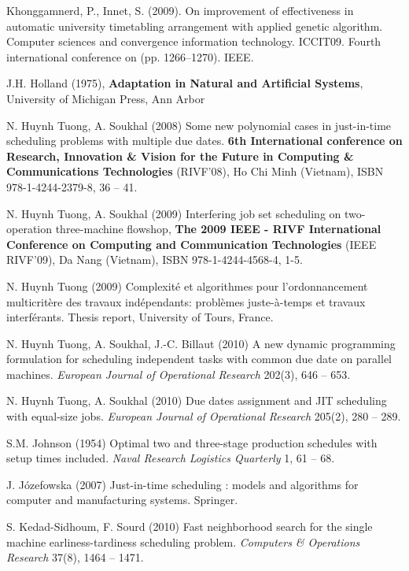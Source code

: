 \documentclass[11pt]{article}
\begin{document}
\begin{thebibliography}{19}
Khonggamnerd, P., Innet, S. (2009). 
On improvement of effectiveness in automatic university timetabling arrangement with applied genetic algorithm. Computer sciences and convergence information technology. 
ICCIT09. Fourth international conference on (pp. 1266–1270). IEEE. 

J.H. Holland (1975), 
\textbf{Adaptation in Natural and Artificial Systems}, University of Michigan Press, Ann Arbor

N. Huynh Tuong, A. Soukhal (2008) 
Some new polynomial cases in just-in-time scheduling problems with multiple due dates. 
\textbf{6th International conference on Research, Innovation \& Vision for the Future in Computing \& Communications Technologies} (RIVF'08), Ho Chi Minh (Vietnam), ISBN 978-1-4244-2379-8, 36 -- 41.

N. Huynh Tuong, A. Soukhal (2009) 
Interfering job set scheduling on two-operation three-machine flowshop, 
\textbf{The 2009 IEEE - RIVF International Conference on Computing and Communication Technologies} (IEEE RIVF'09), Da Nang (Vietnam), ISBN 978-1-4244-4568-4, 1-5.

N. Huynh Tuong (2009) 
Complexité et algorithmes pour l'ordonnancement multicritère des travaux indépendants: problèmes juste-à-temps et travaux interférants. Thesis report, University of Tours, France.  

N. Huynh Tuong, A. Soukhal, J.-C. Billaut (2010) 
A new dynamic programming formulation for scheduling independent tasks with common due date on parallel machines. 
\textit{European Journal of Operational Research} 202(3), 646 -- 653.

N. Huynh Tuong, A. Soukhal (2010) 
Due dates assignment and JIT scheduling with equal-size jobs. 
\textit{European Journal of Operational Research} 205(2), 280 -- 289.


S.M. Johnson (1954) 
Optimal two and three-stage production schedules with setup times included. 
\textit{Naval Research Logistics Quarterly} 1, 61 -- 68.

J. Józefowska (2007) 
Just-in-time scheduling : models and algorithms for computer and manufacturing systems. Springer.

S. Kedad-Sidhoum, F. Sourd (2010) 
Fast neighborhood search for the single machine earliness-tardiness scheduling problem. 
\textit{Computers \& Operations Research} 37(8), 1464 -- 1471.


\end{thebibliography}
\end{document}
